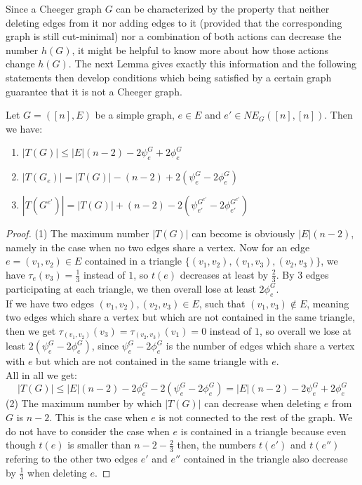 Since a Cheeger graph \(G\) can be characterized by the property that neither deleting edges from it nor adding edges to it (provided that the corresponding graph is still cut-minimal) nor a combination of both actions can decrease the number \(h(G)\), it might be helpful to know more about how those actions change \(h(G)\). The next Lemma gives exactly this information and the following statements then develop conditions which being satisfied by a certain graph guarantee that it is not a Cheeger graph.
\begin{lem}\label{lemma1}
Let \(G=([n],E)\) be a simple graph, \(e\in E\) and \(e'\in NE_G([n],[n])\). Then we have:
\begin{enumerate}
\item \(|T(G)|\leq |E|(n-2)-2\psi_e^G+2\phi_e^G\)
\item \(|T(G_e)|=|T(G)|-(n-2)+2(\psi_e^G-2\phi_e^G)\)
\item \(|T(G^{e'})|=|T(G)|+(n-2)-2(\psi_{e'}^{G^{e'}}-2\phi_{e'}^{G^{e'}})\)
\end{enumerate}
\begin{proof}
(1) The maximum number \(|T(G)|\) can become is obviously \(|E|(n-2)\), namely in the case when no two edges share a vertex. Now for an edge\\
\(e=(v_1,v_2)\in E\) contained in a triangle \(\{(v_1,v_2),(v_1,v_3),(v_2,v_3)\}\), we have \(\tau_e(v_3)=\frac{1}{3}\) instead of \(1\), so \(t(e)\) decreases at least by \(\frac{2}{3}\).
By 3 edges participating at each triangle, we then overall lose at least \(2\phi_e^G\).\\
If we have two edges \((v_1,v_2),(v_2,v_3)\in E\), such that \((v_1,v_3)\notin E\), meaning two edges which share a vertex but which are not contained in the same triangle, then we get \(\tau_{(v_1,v_2)}(v_3)=\tau_{(v_2,v_3)}(v_1)=0\) instead of \(1\), so overall we lose at least \(2(\psi_e^G-2\phi_e^G)\), since \(\psi_e^G-2\phi_e^G\) is the number of edges which share a vertex with \(e\) but which are not contained in the same triangle with \(e\).\\
All in all we get:
\[
|T(G)|\leq|E|(n-2)-2\phi_e^G-2(\psi_e^G-2\phi_e^G)=|E|(n-2)-2\psi_e^G+2\phi_e^G
\]
(2) The maximum number by which \(|T(G)|\) can decrease when deleting \(e\) from \(G\) is \(n-2\). This is the case when \(e\) is not connected to the rest of the graph. We do not have to consider the case when \(e\) is contained in a triangle because even though \(t(e)\) is smaller than \(n-2-\frac{2}{3}\) then, the numbers \(t(e')\) and \(t(e'')\) refering to the other two edges \(e'\) and \(e''\) contained in the triangle also decrease by \(\frac{1}{3}\) when deleting \(e\).

\end{proof}
\end{lem}
